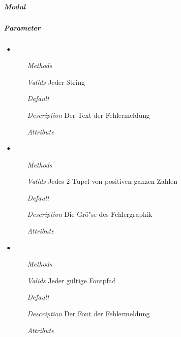 
\newpage

\paragraph{}
\subparagraph{Modul} 


\subparagraph{Parameter} 
\begin{itemize}
\item {}
\begin{enumerate}
\item[\textit{Methods}]
\item[\textit{Valids}] Jeder String
\item[\textit{Default}] 
\item[\textit{Description}] Der Text der Fehlermeldung
\item[\textit{Attribute}] 
\end{enumerate}

\item {}
\begin{enumerate}
\item[\textit{Methods}]
\item[\textit{Valids}] Jedes 2-Tupel von positiven ganzen Zahlen
\item[\textit{Default}] 
\item[\textit{Description}] Die Gr\"o"se des Fehlergraphik
\item[\textit{Attribute}] 
\end{enumerate}

\item {}
\begin{enumerate}
\item[\textit{Methods}]
\item[\textit{Valids}] Jeder g\"ultige Fontpfad
\item[\textit{Default}] 
\item[\textit{Description}] Der Font der Fehlermeldung
\item[\textit{Attribute}] 
\end{enumerate}

\end{itemize}

